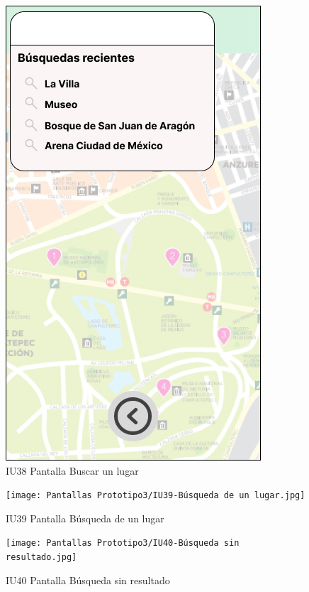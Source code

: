 \begin{figure}[h]
    \begin{minipage}{0.5\textwidth}
        \centering
        \includegraphics[width=.7\linewidth]{Pantallas Prototipo3/IU38-Buscar un lugar.jpg}
        \caption{IU38 Pantalla Buscar un lugar}
    \end{minipage}%
\end{figure}

\begin{figure}[h]
    \begin{minipage}{0.5\textwidth}
        \centering
        \texttt{[image: Pantallas Prototipo3/IU39-Búsqueda de un lugar.jpg]}
        \caption{IU39 Pantalla Búsqueda de un lugar}
    \end{minipage}
    
    \begin{minipage}{0.5\textwidth}
        \centering
        \texttt{[image: Pantallas Prototipo3/IU40-Búsqueda sin resultado.jpg]}
        \caption{IU40 Pantalla Búsqueda sin resultado}
    \end{minipage}%
\end{figure}

